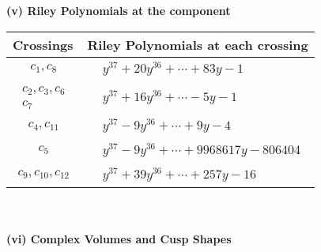\documentclass[1p]{elsarticle_modified}
\theoremstyle{definition}
\begin{document}
\newpage\renewcommand{\arraystretch}{1}
\flushleft \textbf{(v) Riley Polynomials at the component}\newline \\
\begin{tabular}{m{50pt}|m{274pt}}
Crossings & \hspace{64pt}Riley Polynomials at each crossing \\
\hline $$\begin{aligned}c_{1},c_{8}\end{aligned}$$&$\begin{aligned}
&y^{37}+20 y^{36}+\cdots+83 y-1
\end{aligned}$\\
\hline $$\begin{aligned}c_{2},c_{3},c_{6}\\c_{7}\end{aligned}$$&$\begin{aligned}
&y^{37}+16 y^{36}+\cdots-5 y-1
\end{aligned}$\\
\hline $$\begin{aligned}c_{4},c_{11}\end{aligned}$$&$\begin{aligned}
&y^{37}-9 y^{36}+\cdots+9 y-4
\end{aligned}$\\
\hline $$\begin{aligned}c_{5}\end{aligned}$$&$\begin{aligned}
&y^{37}-9 y^{36}+\cdots+9968617 y-806404
\end{aligned}$\\
\hline $$\begin{aligned}c_{9},c_{10},c_{12}\end{aligned}$$&$\begin{aligned}
&y^{37}+39 y^{36}+\cdots+257 y-16
\end{aligned}$\\
\hline
\end{tabular}\\~\\
\newpage\flushleft \textbf{(vi) Complex Volumes and Cusp Shapes}
\end{document}
